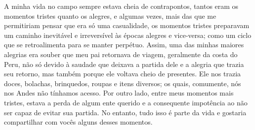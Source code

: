A minha vida no campo sempre estava cheia de contrapontos, tantos eram os momentos tristes quanto os alegres, e algumas vezes, mais das que me permitiriam pensar que era só uma casualidade, os momentos tristes preparavam um caminho inevitável e irreversível às épocas alegres e vice-versa; como um ciclo que se retroalimenta para se manter perpétuo. 
Assim, uma das minhas maiores alegrias era souber que meu pai retornava de viagem, geralmente da costa do Peru, não só devido à saudade que deixava a partida dele e a alegria que trazia seu retorno, mas também porque ele voltava cheio de presentes. Ele nos trazia doces, bolachas, brinquedos, roupas e itens diversos; os quais, comumente, nós nos Andes não tínhamos acesso.
Por outro lado, entre meus momentos mais tristes, estava a perda de algum ente querido e a consequente impotência ao não ser capaz de evitar sua partida. 
No entanto, tudo isso é parte da vida e gostaria compartilhar com vocês alguns desses momentos.



